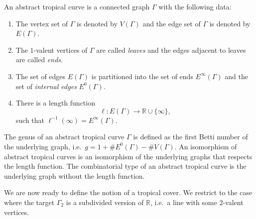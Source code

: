 \documentclass[ALCO,published]{cedram}
\begin{document}
\begin{defi}
An abstract tropical curve is a connected graph $\Gamma$ with the following data:
\begin{enumerate}
    \item The vertex set of $\Gamma$ is denoted by $V(\Gamma)$ and the edge set of $\Gamma$ is denoted by $E(\Gamma)$.
    \item The $1$-valent vertices of $\Gamma$ are called \textit{leaves} and the edges adjacent to leaves are called \textit{ends}.
    \item The set of edges $E(\Gamma)$ is partitioned into the set of ends $E^\infty(\Gamma)$ and the set of \textit{internal edges} $E^0(\Gamma)$.
    \item There is a length function
    \begin{equation*}
        \ell\colon E(\Gamma)\to\mathbb{R}\cup\{\infty\},
    \end{equation*}
    such that $\ell^{-1}(\infty)=E^\infty(\Gamma)$.
\end{enumerate}
The genus of an abstract tropical curve $\Gamma$ is defined as the first Betti number of the underlying graph, i.e.\ $g=1+\# E^0(\Gamma)-\# V(\Gamma)$. An isomorphism of abstract tropical curves is an isomorphism of the underlying graphs that respects the length function. The combinatorial type of an abstract tropical curve is the underlying graph without the length function.
\end{defi}

We are now ready to define the notion of a tropical cover. We restrict to the case where the target $\Gamma_2$ is a subdivided version of $\mathbb{R}$, i.e.\ a line with some $2$-valent vertices.
\end{document}
